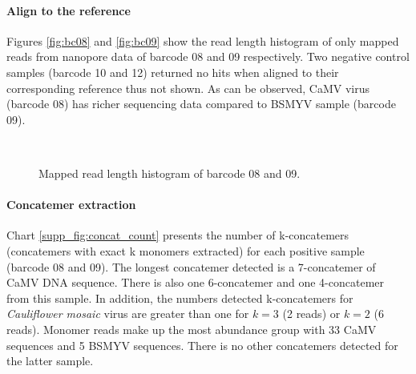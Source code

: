 \paragraph{Align to the reference}
Figures \ref{fig:bc08} and \ref{fig:bc09} show the read length histogram of only mapped reads from nanopore data of barcode 08 and 09 respectively. Two negative control samples (barcode 10 and 12) returned no hits when aligned to their corresponding reference thus not shown. As can be observed, CaMV virus (barcode 08) has richer sequencing data compared to BSMYV sample (barcode 09).
\begin{figure}[!ht]
\centering
{}
~
\caption{Mapped read length histogram of barcode 08 and 09.}
\label{fig:concat_map}
\end{figure}

\paragraph{Concatemer extraction}
Chart \ref{supp_fig:concat_count} presents the number of k-concatemers (concatemers with exact k monomers extracted) for each positive sample (barcode 08 and 09). 
The longest concatemer detected is a 7-concatemer of CaMV DNA sequence. 
There is also one 6-concatemer and one 4-concatemer from this sample. 
In addition, the numbers detected k-concatemers for \emph{Cauliflower mosaic} virus are greater than one for $k=3$ (2 reads) or $k=2$ (6 reads).
Monomer reads make up the most abundance group with 33 CaMV sequences and 5 BSMYV sequences.
There is no other concatemers detected for the latter sample.

